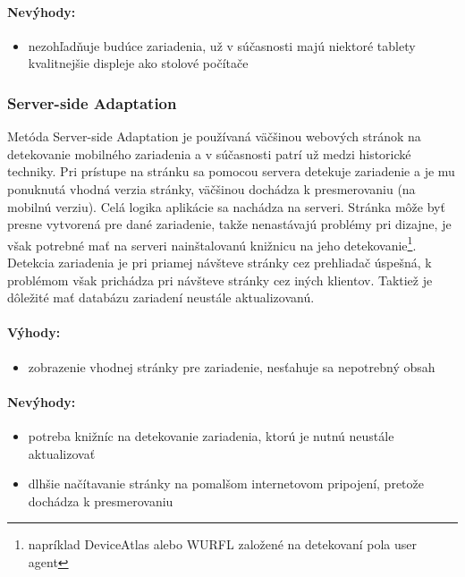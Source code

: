 \paragraph{Nevýhody:}
\begin{itemize}
	\item nezohľadňuje budúce zariadenia, už v súčasnosti majú niektoré tablety kvalitnejšie displeje ako stolové počítače 
\end{itemize}



\subsubsection{Server-side Adaptation} %
\label{ssub:ress_}

Metóda Server-side Adaptation je používaná väčšinou webových stránok na detekovanie mobilného zariadenia a v súčasnosti patrí už medzi historické techniky. Pri prístupe na stránku sa pomocou servera detekuje zariadenie a je mu ponuknutá vhodná verzia stránky, väčšinou dochádza k presmerovaniu (na mobilnú verziu). Celá logika aplikácie sa nachádza na serveri. Stránka môže byť presne vytvorená pre dané zariadenie, takže nenastávajú problémy pri dizajne, je však potrebné mať na serveri nainštalovanú knižnicu na jeho detekovanie\footnote{napríklad DeviceAtlas alebo WURFL založené na detekovaní pola user agent}. Detekcia zariadenia je pri priamej návšteve stránky cez prehliadač úspešná, k problémom však prichádza pri návšteve stránky cez iných klientov. Taktiež je dôležité mať databázu zariadení neustále aktualizovanú.

\paragraph{Výhody:}
\begin{itemize}
	\item zobrazenie vhodnej stránky pre zariadenie, nesťahuje sa nepotrebný obsah
\end{itemize}

\paragraph{Nevýhody:}
\begin{itemize}
	\item potreba knižníc na detekovanie zariadenia, ktorú je nutnú neustále aktualizovať
	\item dlhšie načítavanie stránky na pomalšom internetovom pripojení, pretože dochádza k presmerovaniu
\end{itemize}

